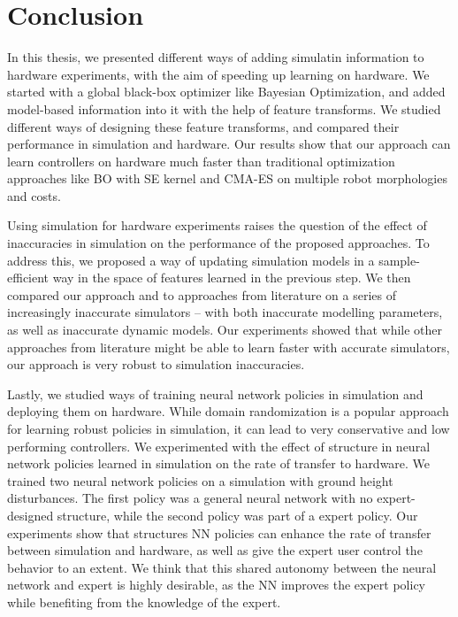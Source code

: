 \chapter{Conclusion}


In this thesis, we presented different ways of adding simulatin information to hardware experiments, with the aim of speeding up learning on hardware. We started with a global black-box optimizer like Bayesian Optimization, and added model-based information into it with the help of feature transforms. We studied different ways of designing these feature transforms, and compared their performance in simulation and hardware. Our results show that our approach can learn controllers on hardware much faster than traditional optimization approaches like BO with SE kernel and CMA-ES on multiple robot morphologies and costs. 

Using simulation for hardware experiments raises the question of the effect of inaccuracies in simulation on the performance of the proposed approaches. To address this, we proposed a way of updating simulation models in a sample-efficient way in the space of features learned in the previous step. We then compared our approach and to approaches from literature on a series of increasingly inaccurate simulators -- with both inaccurate modelling parameters, as well as inaccurate dynamic models. Our experiments showed that while other approaches from literature might be able to learn faster with accurate simulators, our approach is very robust to simulation inaccuracies.

Lastly, we studied ways of training neural network policies in simulation and deploying them on hardware. While domain randomization is a popular approach for learning robust policies in simulation, it can lead to very conservative and low performing controllers. We experimented with the effect of structure in neural network policies learned in simulation on the rate of transfer to hardware. We trained two neural network policies on a simulation with ground height disturbances. The first policy was a general neural network with no expert-designed structure, while the second policy was part of a expert policy. Our experiments show that structures NN policies can enhance the rate of transfer between simulation and hardware, as well as give the expert user control the behavior to an extent. We think that this shared autonomy between the neural network and expert is highly desirable, as the NN improves the expert policy while benefiting from the knowledge of the expert.

